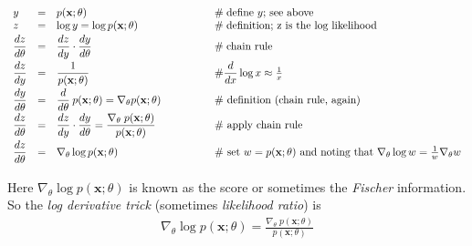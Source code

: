 \documentclass[11pt, oneside]{article}   	%
\begin{document}
\begin{equation*}
\begin{array}{lllll}
y 
&=&  p(\mathbf{x}; \theta)                                                                                        & \qquad \qquad \mathrel{\#} \text{define $y$; see above} \\  
\vspace{0.80mm}
z 
&=&                  \log y = \log p(\mathbf{x}; \theta)                                                    & \qquad \qquad \mathrel{\#}  \text{definition; z is the  log likelihood}\\  
\vspace{0.80mm}
\dfrac{dz}{d \theta} 
&=&                   \dfrac{dz}{dy} \cdot \dfrac{dy}{d\theta}                                               & \qquad \qquad \mathrel{\#}  \text{chain rule} \\
\vspace{0.80mm}
\dfrac{dz}{dy} 
&=&                     \dfrac{1}{p(\mathbf{x};\theta)}                                                        & \qquad \qquad \mathbin{\#} \dfrac{d}{dx} \log x \approx \frac{1}{x} \\
\vspace{0.80mm}
 \dfrac{dy}{d\theta} 
 &=& \dfrac{d}{d\theta}  \:p(\mathbf{x};\theta) = \nabla_\theta p(\mathbf{x};\theta)   & \qquad \qquad  \mathbin{\#} \text{ definition (chain rule, again)}\\
 \vspace{0.80mm}
 \dfrac{dz}{d \theta} 
 &=&          \dfrac{dz}{dy} \cdot \dfrac{dy}{d\theta} = \dfrac{\nabla_\theta \; p(\mathbf{x};\theta)}{p(\mathbf{x};\theta)} & \qquad \qquad  \mathbin{\#} \text{ apply chain rule} \\
 \vspace{0.80mm}
 \dfrac{dz}{d \theta} 
&=&  \nabla_\theta \log p(\mathbf{x};\theta)                                           & \qquad \qquad\mathbin{\#} \text{ set $w = p(\mathbf{x};\theta)$ and noting that } \nabla_{\theta} \log w = \frac{1}{w}\nabla_\theta w 
\end{array}
\end{equation*}

\bigskip
\noindent
Here $\nabla_\theta \log p(\mathbf{x};\theta)$ is known as the score or sometimes the \emph{Fischer} information. So the \emph{log derivative trick} (sometimes \emph{likelihood ratio}) is 
\begin{align*}
\nabla_\theta \log p(\mathbf{x};\theta)   = \frac{\nabla_\theta \; p(\mathbf{x};\theta)}{p(\mathbf{x};\theta)}
\end{align*}
\end{document}
